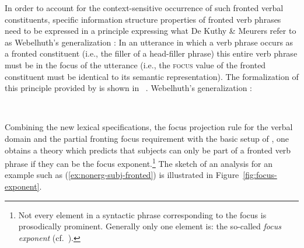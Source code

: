 \documentclass[output=paper
	        ,collection
	        ,collectionchapter
 	        ,biblatex
                ,babelshorthands
                ,newtxmath
                ,draftmode
                ,colorlinks, citecolor=brown
]{langscibook}
\begin{document}
In order to account for the context-sensitive occurrence of such
fronted verbal constituents, specific information structure properties
of fronted verb phrases need to be expressed in a principle expressing
what De Kuthy \& Meurers refer to as Webelhuth's generalization \citep[53]{Webelhuth90-ohne-crossref}: In
an utterance in which a verb phrase occurs as a fronted constituent
(i.e., the filler of a head-filler phrase) this entire verb phrase
must be in the focus of the utterance (i.e., the \textsc{focus} value
of the fronted constituent must be identical to its semantic
representation).  The formalization of this principle provided by \citep{dKM2003a} is shown in~ .
\ea
\bigskip
Webelhuth's generalization \citep{dKM2003a}:\\
\begin{flushleft}
\impl\ 
\end{flushleft}
\begin{flushright}
\medskip
\label{fig:webelhuths-generalization}
\end{flushright}\unskip
\z
Combining the new lexical specifications, the focus projection rule
for the verbal domain and the partial fronting focus requirement with
the basic setup of \cite{deKuthy2002a}, one obtains a theory which
predicts that subjects can only be part of a fronted verb phrase
if they can be the focus exponent.\footnote{Not every element in a syntactic phrase corresponding to the focus is prosodically prominent. Generally only one element is: the so-called \textit{focus exponent} (cf.\ \citealt{Selkirk95a-u}).} The sketch of an analysis for an
example such as (\ref{ex:nonerg-subj-fronted}) is illustrated in
Figure~\ref{fig:focus-exponent}.
\end{document}
